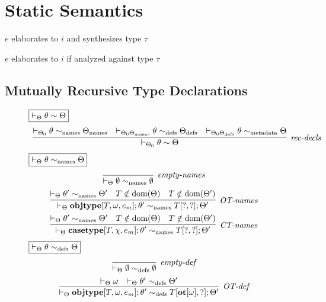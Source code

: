 \section{Static Semantics}
$e$ elaborates to $i$ and synthesizes type $\tau$

  $e$ elaborates to $i$ if analyzed against type $\tau$

\subsection{Mutually Recursive Type Declarations}
\begin{figure}[h]
$\fbox{$\vdash_\Theta \theta \sim \Theta$}$
\[
\begin{array}{c}
\infer[\textit{rec-decls}]
  {\vdash_{\Theta_0} \theta \sim \Theta}
  { \vdash_{\Theta_0} \theta \sim_{\text{names}} \Theta_{\text{names}}
  & \vdash_{\Theta_0 \Theta_{\text{names}}} \theta \sim_{\text{defs}} \Theta_{\text{defs}}
  & \vdash_{\Theta_0 \Theta_{\text{defs}}} \theta \sim_{\text{metadata}} \Theta
  } 
\end{array}
\]
$\fbox{$\vdash_\Theta \theta \sim_{\text{names}} \Theta$}$
\[
\begin{array}{c}
\infer[\textit{empty-names}]
  {\vdash_{\Theta} \emptyset \sim_{\text{names}} \emptyset}
  { }\\[1ex] 
  
\infer[\textit{OT-names}]
  {\vdash_{\Theta} \keyw{objtype}[T,\omega,e_m];\theta' \sim_{\text{names}} T[?,?];\Theta'}
  {\vdash_{\Theta} \theta' \sim_{\text{names}} \Theta'
  & T \notin \text{dom}(\Theta) & T \notin \text{dom}(\Theta')}\\[1ex]

\infer[\textit{CT-names}]
  {\vdash_{\Theta} \keyw{casetype}[T,\chi,e_m];\theta' \sim_{\text{names}} T[?,?];\Theta'}
  {\vdash_{\Theta} \theta' \sim_{\text{names}} \Theta'
  & T \notin \text{dom}(\Theta) & T \notin \text{dom}(\Theta')}
\end{array}
\]
$\fbox{$\vdash_\Theta \theta \sim_{\text{defs}} \Theta$}$
\[
\begin{array}{c}
\infer[\textit{empty-def}]
  {\vdash_{\Theta} \emptyset \sim_{\text{defs}} \emptyset}
  { }\\[1ex] 
  
\infer[\textit{OT-def}]
  {\vdash_{\Theta} \keyw{objtype}[T,\omega,e_m];\theta' \sim_{\text{defs}} T[\keyw{ot}[\omega], ?]; \Theta'}
  { \vdash_\Theta \omega
  & \vdash _\Theta \theta' \sim_{\text{defs}} \Theta'}\\[1ex]


\end{array}\]
\end{figure}
